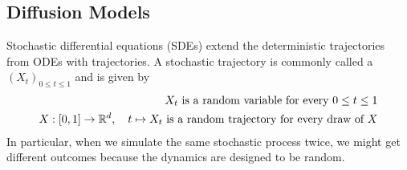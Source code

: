 


\subsection{Diffusion Models}
Stochastic differential equations (SDEs) extend the deterministic trajectories from ODEs with  trajectories. A stochastic trajectory is commonly called a  $(X_t)_{0\leq t\leq 1}$ and is given by
\begin{align*}
    X_t \text{ is a random variable for every } 0\leq t\leq 1\\
    X: [0,1] \to \mathbb{R}^d, \quad t \mapsto X_t\text{ is a random trajectory for every draw of }X
\end{align*}
In particular, when we simulate the same stochastic process twice, we might get different outcomes because the dynamics are designed to be random.

